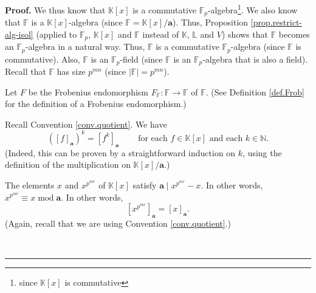 \documentclass[numbers=enddot,12pt,final,onecolumn,notitlepage]{scrartcl}%
\theoremstyle{definition}
\newenvironment{proof}[1][Proof]{\noindent\textbf{#1.} }{\ \rule{0.5em}{0.5em}}
\begin{document}
\begin{proof}
We thus know that $\mathbb{K}\left[  x\right]  $ is a commutative
$\mathbb{F}_{p}$-algebra\footnote{since $\mathbb{K}\left[  x\right]  $ is
commutative}. We also know that $\mathbb{F}$ is a $\mathbb{K}\left[  x\right]
$-algebra (since $\mathbb{F}=\mathbb{K}\left[  x\right]  /\mathbf{a}$). Thus,
Proposition \ref{prop.restrict-alg-isol} (applied to $\mathbb{F}_{p}$,
$\mathbb{K}\left[  x\right]  $ and $\mathbb{F}$ instead of $\mathbb{K}$,
$\mathbb{L}$ and $V$) shows that $\mathbb{F}$ becomes an $\mathbb{F}_{p}%
$-algebra in a natural way. Thus, $\mathbb{F}$ is a commutative $\mathbb{F}%
_{p}$-algebra (since $\mathbb{F}$ is commutative). Also, $\mathbb{F}$ is an
$\mathbb{F}_{p}$-field (since $\mathbb{F}$ is an $\mathbb{F}_{p}$-algebra that
is also a field). Recall that $\mathbb{F}$ has size $p^{mn}$ (since
$\left\vert \mathbb{F}\right\vert =p^{mn}$).

Let $F$ be the Frobenius endomorphism $F_{\mathbb{F}}:\mathbb{F}%
\rightarrow\mathbb{F}$ of $\mathbb{F}$. (See Definition \ref{def.Frob} for the
definition of a Frobenius endomorphism.)

Recall Convention \ref{conv.quotient}. We have
\begin{equation}
\left(  \left[  f\right]  _{\mathbf{a}}\right)  ^{k}=\left[  f^{k}\right]
_{\mathbf{a}}\ \ \ \ \ \ \ \ \ \ \text{for each }f\in\mathbb{K}\left[
x\right]  \text{ and each }k\in\mathbb{N}. \label{pf.lem.xpg-x.2.fak}%
\end{equation}
(Indeed, this can be proven by a straightforward induction on $k$, using the
definition of the multiplication on $\mathbb{K}\left[  x\right]  /\mathbf{a}$.)

The elements $x$ and $x^{p^{mr}}$ of $\mathbb{K}\left[  x\right]  $ satisfy
$\mathbf{a}\mid x^{p^{mr}}-x$. In other words, $x^{p^{mr}}\equiv
x\operatorname{mod}\mathbf{a}$. In other words,
\begin{equation}
\left[  x^{p^{mr}}\right]  _{\mathbf{a}}=\left[  x\right]  _{\mathbf{a}}.
\label{pf.lem.xpg-x.2.xpmr}%
\end{equation}
(Again, recall that we are using Convention \ref{conv.quotient}.)


\end{proof}
\end{document}
